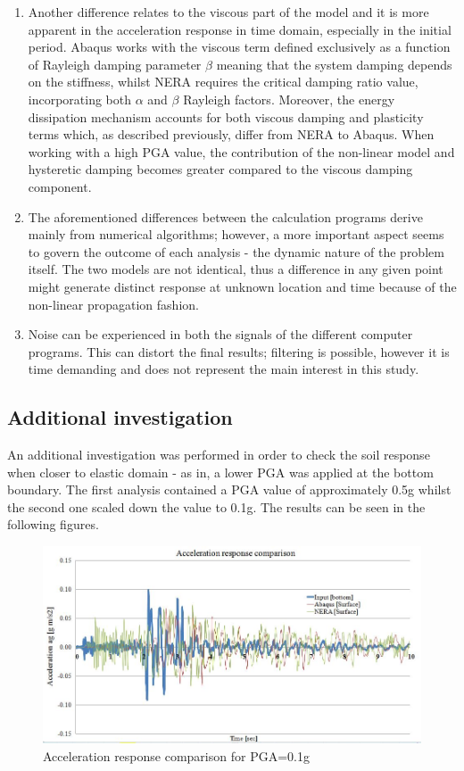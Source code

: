 \begin{enumerate}
		\item Another difference relates to the viscous part of the model and it is more apparent in the acceleration response in time domain, especially in the initial period. Abaqus works with the viscous term defined exclusively as a function of Rayleigh damping parameter $\beta$ meaning that the system damping depends on the stiffness, whilst NERA requires the critical damping ratio value, incorporating both $\alpha$ and $\beta$ Rayleigh factors. Moreover, the energy dissipation mechanism accounts for both viscous damping and plasticity terms which, as described previously, differ from NERA to Abaqus. When working with a high PGA value, the contribution of the non-linear model and hysteretic damping becomes greater compared to the viscous damping component.
		\item The aforementioned differences between the calculation programs derive mainly from numerical algorithms; however, a more important aspect seems to govern the outcome of each analysis - the dynamic nature of the problem itself. The two models are not identical, thus a difference in any given point might generate distinct response at unknown location and time because of the non-linear propagation fashion. 
		\item Noise can be experienced in both the signals of the different computer programs. This can distort the final results; filtering is possible, however it is time demanding and does not represent the main interest in this study.
	\end{enumerate}
	
	\subsection{Additional investigation}
	An additional investigation was performed in order to check the soil response when closer to elastic domain - as in, a lower PGA was applied at the bottom boundary. The first analysis contained a PGA value of approximately 0.5g whilst the second one scaled down the value to 0.1g. The results can be seen in the following figures.
	
	\begin{figure}[h!]
		\centering
		\includegraphics[width=0.7\linewidth]{"acc_low"}
		\caption{Acceleration response comparison for PGA=0.1g}
		\label{acc_low}
	\end{figure}
	
